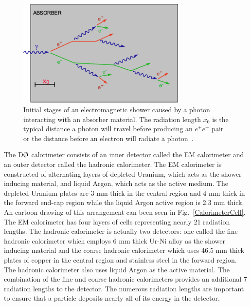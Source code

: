 \begin{figure}[!h!tbp]
\begin{center}
\includegraphics[width=0.75\textwidth]{eps/D0/shower.eps}
\end{center}
\vspace{-0.1in}
\caption{Initial stages of an electromagnetic shower caused by a photon interacting with an absorber material. The radiation length $x_{0}$ is the typical distance a photon will travel before producing an $e^{+}e^{-}$ pair or the distance before an electron will radiate a photon~\cite{shower}.}
\label{EMshower}
\end{figure}

The $\dzero$ calorimeter consists of an inner detector called the EM calorimeter and an outer detector called the hadronic calorimeter. The EM calorimeter is constructed of alternating layers of depleted Uranium, which acts as the shower inducing material, and liquid Argon, which acts as the active medium. The depleted Uranium plates are 3 mm thick in the central region and 4 mm thick in the forward end-cap region while the liquid Argon active region is 2.3 mm thick. An cartoon drawing of this arrangement can been seen in Fig.~\ref{CalorimeterCell}. The EM calorimeter has four layers of cells representing nearly 21 radiation lengths. The hadronic calorimeter is actually two detectors: one called the fine hadronic calorimeter which employs 6 mm thick Ur-Ni alloy as the shower inducing material and the coarse hadronic calorimeter which uses 46.5 mm thick plates of copper in the central region and stainless steel in the forward region. The hadronic calorimeter also uses liquid Argon as the active material. The combination of the fine and coarse hadronic calorimeters provides an additional 7 radiation lengths to the detector. The numerous radiation lengths are important to ensure that a particle deposits nearly all of its energy in the detector.


